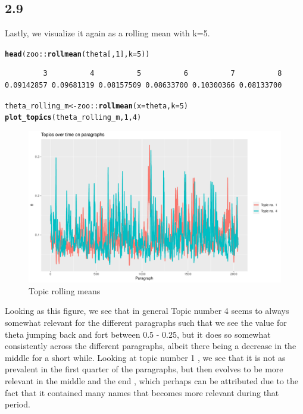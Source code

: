 \documentclass[10pt, a4paper, english]{article}\usepackage[]{graphicx}\usepackage[dvipsnames]{xcolor}
\makeatletter
\def\maxwidth{ %
  \ifdim\Gin@nat@width>\linewidth
    \linewidth
  \else
    \Gin@nat@width
  \fi
}
\newcommand{\hlnum}[1]{\textcolor[rgb]{0.686,0.059,0.569}{#1}}%
\newcommand{\hlopt}[1]{\textcolor[rgb]{0,0,0}{#1}}%
\newcommand{\hlstd}[1]{\textcolor[rgb]{0.345,0.345,0.345}{#1}}%
\newcommand{\hlkwb}[1]{\textcolor[rgb]{0.69,0.353,0.396}{#1}}%
\newcommand{\hlkwc}[1]{\textcolor[rgb]{0.333,0.667,0.333}{#1}}%
\newcommand{\hlkwd}[1]{\textcolor[rgb]{0.737,0.353,0.396}{\textbf{#1}}}%
\newenvironment{kframe}{%
 \def\at@end@of@kframe{}%
 \ifinner\ifhmode%
  \def\at@end@of@kframe{\end{minipage}}%
  \begin{minipage}{\columnwidth}%
 \fi\fi%
 \def\FrameCommand##1{\hskip\@totalleftmargin \hskip-\fboxsep
 \colorbox{shadecolor}{##1}\hskip-\fboxsep
     \hskip-\linewidth \hskip-\@totalleftmargin \hskip\columnwidth}%
 \MakeFramed {\advance\hsize-\width
   \@totalleftmargin\z@ \linewidth\hsize
   \@setminipage}}%
 {\par\unskip\endMakeFramed%
 \at@end@of@kframe}
\newenvironment{knitrout}{}{} %
\makeatother
\begin{document}
\subsection{2.9}
Lastly, we visualize it again as a rolling mean with k=5. 
\begin{knitrout}
\color{fgcolor}\begin{kframe}
\begin{alltt}
\hlkwd{head}\hlstd{(zoo}\hlopt{::}\hlkwd{rollmean}\hlstd{(theta[,}\hlnum{1}\hlstd{],} \hlkwc{k}\hlstd{=}\hlnum{5}\hlstd{))}
\end{alltt}
\begin{verbatim}
         3          4          5          6          7          8 
0.09142857 0.09681319 0.08157509 0.08633700 0.10300366 0.08133700 
\end{verbatim}
\begin{alltt}
\hlstd{theta_rolling_m} \hlkwb{<-} \hlstd{zoo}\hlopt{::}\hlkwd{rollmean}\hlstd{(}\hlkwc{x}\hlstd{=theta,} \hlkwc{k} \hlstd{=}\hlnum{5}\hlstd{)}
\hlkwd{plot_topics}\hlstd{(theta_rolling_m,} \hlnum{1}\hlstd{,} \hlnum{4}\hlstd{)}
\end{alltt}
\end{kframe}\begin{figure}
\includegraphics[width=\maxwidth]{figure/topic_means-1} \caption[Topic rolling means]{Topic rolling means}\label{fig:topic_means}
\end{figure}

\end{knitrout}
Looking as this figure, we see that in general Topic number 4 seems to always somewhat relevant for the different paragraphs such that we see the value for theta jumping back and fort between 0.5 - 0.25, but it does so somewhat consistently across the different paragraphs, albeit there being a decrease in the middle for a short while. Looking at topic number 1 , we see that it is not as prevalent in the first quarter of the paragraphs, but then evolves to be more relevant in the middle and the end , which perhaps can be attributed due to the fact that it contained many names that becomes more relevant during that period. 
\end{document}
